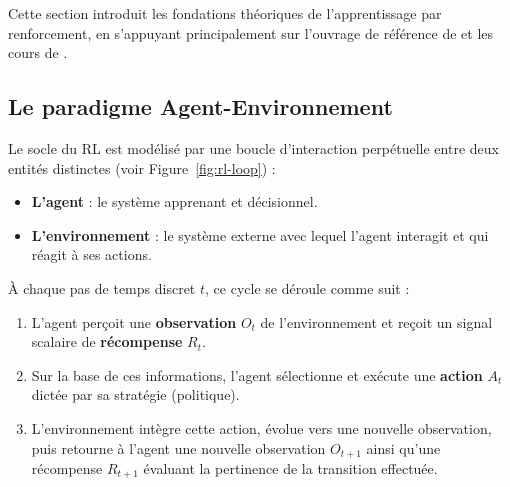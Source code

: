 Cette section introduit les fondations théoriques de l'apprentissage par renforcement, en s'appuyant principalement sur l'ouvrage de référence de \textcite{suttonReinforcementLearningIntroduction2018} et les cours de \textcite{silverLecturesReinforcementLearning2015}.

\subsection{Le paradigme Agent-Environnement}

Le socle du RL est modélisé par une boucle d'interaction perpétuelle entre deux entités distinctes \parencite{suttonReinforcementLearningIntroduction2018} (voir Figure~\ref{fig:rl-loop}) : 
\begin{itemize}
    \item \textbf{L'agent} : le système apprenant et décisionnel.
    \item \textbf{L'environnement} : le système externe avec lequel l'agent interagit et qui réagit à ses actions.
\end{itemize}

À chaque pas de temps discret $t$, ce cycle se déroule comme suit :
\begin{enumerate}
    \item L'agent perçoit une \textbf{observation} $O_t$ de l'environnement et reçoit un signal scalaire de \textbf{récompense} $R_t$.
    \item Sur la base de ces informations, l'agent sélectionne et exécute une \textbf{action} $A_t$ dictée par sa stratégie (politique).
    \item L'environnement intègre cette action, évolue vers une nouvelle observation, puis retourne à l'agent une nouvelle observation $O_{t+1}$ ainsi qu'une récompense $R_{t+1}$ évaluant la pertinence de la transition effectuée.
\end{enumerate}

